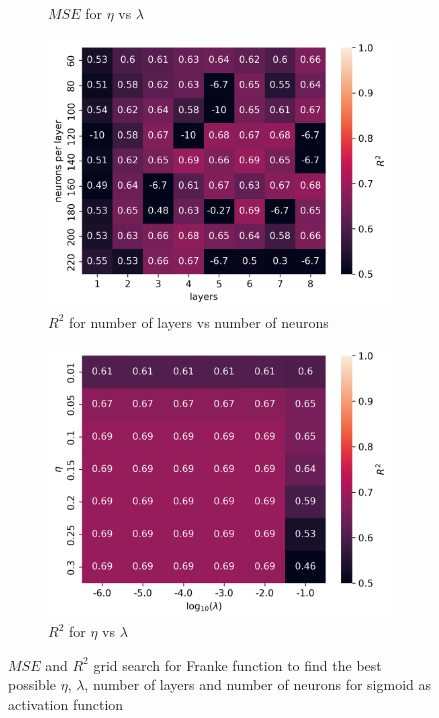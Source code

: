 \documentclass[11pt]{article}
\begin{document}
\begin{figure}[H]
\begin{subfigure}{.5\textwidth}
        \caption{$MSE$ for $\eta$ vs $\lambda$}
        \label{fig:}
    \end{subfigure}
    \begin{subfigure}{.5\textwidth}
        \centering
        \includegraphics[width=\textwidth]{../figures/franke_L_n_test_sigmoid_R2.png}
        \caption{$R^2$ for number of layers vs number of neurons}
        \label{fig:}
    \end{subfigure}
    \begin{subfigure}{.5\textwidth}
        \centering
        \includegraphics[width=\textwidth]{../figures/franke_eta_lmb_sigmoid_R2.png}
        \caption{$R^2$ for $\eta$ vs $\lambda$}
        \label{fig:}
    \end{subfigure}
    \caption{$MSE$ and $R^2$ grid search for Franke function to find the best possible $\eta$, $\lambda$, number of layers and number of neurons for sigmoid as activation function}
    \label{fig:franke_grid}
\end{figure}
\end{document}
